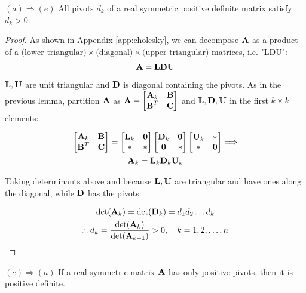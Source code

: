 \documentclass[a4paper]{article}
\numberwithin{equation}{section} %
\newcommand{\B}[1]{\textbf{\textup{#1}}} %
\begin{document}
\begin{lemma}
$(a)\Rightarrow (e)$ All pivots $d_k$ of a real symmetric positive definite matrix satisfy $d_{k}>0$.
\end{lemma}
\begin{proof}
As shown in Appendix \ref{app:cholesky}, we can decompose $\B{A}$ as a product of a $\text{(lower triangular)} \times \text{(diagonal)} \times \text{(upper triangular)}$ matrices, i.e. "LDU":\\
\[
\B{A}=\B{LDU}
\]
$\B{L}, \B{U}$ are unit triangular and $\B{D}$ is diagonal containing the pivots. As in the previous lemma, partition $\B{A}$ as $\B{A}=\begin{bmatrix}\B{A}_{k} & \B{B}\\\B{B}^{T} & \B{C}  \end{bmatrix}$ and $\B{L}, \B{D}, \B{U}$ in the first $k \times k$ elements:

\[
\begin{gathered}
\begin{bmatrix}\B{A}_{k} & \B{B}\\\B{B}^{T} & \B{C}  \end{bmatrix}=
\begin{bmatrix}\B{L}_{k} & \B{0} \\ * & *\end{bmatrix}
\begin{bmatrix}\B{D}_{k} & \B{0} \\ \B{0} & * \end{bmatrix} 
\begin{bmatrix}\B{U}_{k} & * \\ * & \B{0}\end{bmatrix} \Longrightarrow \\
\B{A}_{k}=\B{L}_{k}\B{D}_{k}\B{U}_{k}
\end{gathered}
\]

Taking determinants above and because $\B{L}, \B{U}$ are triangular and have ones along the diagonal, while $\B{D}$ has the pivots:

\[
\begin{gathered}
\textup{det}(\B{A}_{k})=\textup{det}(\B{D}_{k})=d_{1}d_{2}\ldots d_{k} \\
\therefore d_{k} = \frac{\textup{det}(\B{A}_{k})}{\textup{det}(\B{A}_{k-1})}>0, \quad k=1,2,\ldots ,n
\end{gathered}
\]

\end{proof}

\begin{lemma}
$(e)\Rightarrow (a)$ If a real symmetric matrix $\B{A}$ has only positive pivots, then it is positive definite.
\end{lemma}
\end{document}
